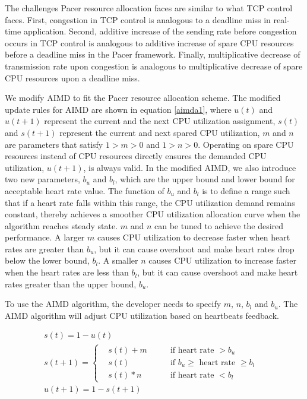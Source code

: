 The challenges Pacer resource allocation faces are similar to what TCP control faces. First, congestion in TCP control is analogous to a deadline miss in real-time application. Second, additive increase of the sending rate before congestion occurs in TCP control is analogous to additive increase of spare CPU resources before a deadline miss in the Pacer framework. Finally, multiplicative decrease of transmission rate upon congestion is analogous to multiplicative decrease of spare CPU resources upon a deadline miss. 

We modify AIMD to fit the Pacer resource allocation scheme. The modified update rules for AIMD are shown in equation \ref{aimda1}, where $u(t)$ and $u(t+1)$ represent the current and the next CPU utilization assignment, $s(t)$ and $s(t+1)$ represent the current and next spared CPU utilization, $m$ and $n$ are parameters that satisfy $1>m>0$ and $1>n>0$. Operating on spare CPU resources instead of CPU resources directly ensures the demanded CPU utilization, $u(t+1)$, is always valid. In the modified AIMD, we also introduce two new parameters, $b_u$ and $b_l$, which are the upper bound and lower bound for acceptable heart rate value. The function of $b_u$ and $b_l$ is to define a range such that if a heart rate falls within this range, the CPU utilization demand remains constant, thereby achieves a smoother CPU utilization allocation curve when the algorithm reaches steady state. $m$ and $n$ can be tuned to achieve the desired performance. A larger $m$ causes CPU utilization to decrease faster when heart rates are greater than $b_u$, but it can cause overshoot and make heart rates drop below the lower bound, $b_l$. A smaller $n$ causes CPU utilization to increase faster when the heart rates are less than $b_l$, but it can cause overshoot and make heart rates greater than the upper bound, $b_u$. 

To use the AIMD algorithm, the developer needs to specify $m$, $n$, $b_l$ and $b_u$. The AIMD algorithm will adjust CPU utilization based on heartbeats feedback.


\begin{equation}
\begin{aligned}
\label{aimda1}
&s(t)=1-u(t)&&\\
&s(t+1)=\left\{\begin{matrix}
&s(t)+m \qquad &\text{if heart rate $> b_u$}\\
&s(t)&\text{if $b_u \geq$ heart rate $\geq b_l$} \\
&s(t)* n &\text{if heart rate $< b_l$ } 
\end{matrix}\right. \\
&u(t+1)=1-s(t+1)&&
\end{aligned}
\end{equation}

